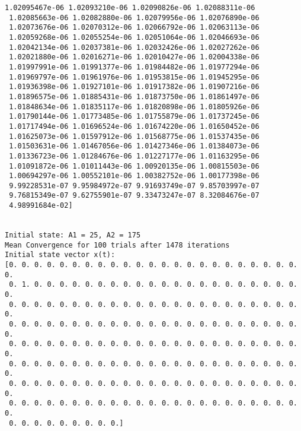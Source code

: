 \documentclass[11pt]{article}
\begin{document}
\begin{Verbatim}[commandchars=\\\{\}]
 1.02095467e-06 1.02093210e-06 1.02090826e-06 1.02088311e-06
 1.02085663e-06 1.02082880e-06 1.02079956e-06 1.02076890e-06
 1.02073676e-06 1.02070312e-06 1.02066792e-06 1.02063113e-06
 1.02059268e-06 1.02055254e-06 1.02051064e-06 1.02046693e-06
 1.02042134e-06 1.02037381e-06 1.02032426e-06 1.02027262e-06
 1.02021880e-06 1.02016271e-06 1.02010427e-06 1.02004338e-06
 1.01997991e-06 1.01991377e-06 1.01984482e-06 1.01977294e-06
 1.01969797e-06 1.01961976e-06 1.01953815e-06 1.01945295e-06
 1.01936398e-06 1.01927101e-06 1.01917382e-06 1.01907216e-06
 1.01896575e-06 1.01885431e-06 1.01873750e-06 1.01861497e-06
 1.01848634e-06 1.01835117e-06 1.01820898e-06 1.01805926e-06
 1.01790144e-06 1.01773485e-06 1.01755879e-06 1.01737245e-06
 1.01717494e-06 1.01696524e-06 1.01674220e-06 1.01650452e-06
 1.01625073e-06 1.01597912e-06 1.01568775e-06 1.01537435e-06
 1.01503631e-06 1.01467056e-06 1.01427346e-06 1.01384073e-06
 1.01336723e-06 1.01284676e-06 1.01227177e-06 1.01163295e-06
 1.01091872e-06 1.01011443e-06 1.00920135e-06 1.00815503e-06
 1.00694297e-06 1.00552101e-06 1.00382752e-06 1.00177398e-06
 9.99228531e-07 9.95984972e-07 9.91693749e-07 9.85703997e-07
 9.76815349e-07 9.62755901e-07 9.33473247e-07 8.32084676e-07
 4.98991684e-02]


Initial state: A1 = 25, A2 = 175
Mean Convergence for 100 trials after 1478 iterations
Initial state vector x(t):
[0. 0. 0. 0. 0. 0. 0. 0. 0. 0. 0. 0. 0. 0. 0. 0. 0. 0. 0. 0. 0. 0. 0. 0.
 0. 1. 0. 0. 0. 0. 0. 0. 0. 0. 0. 0. 0. 0. 0. 0. 0. 0. 0. 0. 0. 0. 0. 0.
 0. 0. 0. 0. 0. 0. 0. 0. 0. 0. 0. 0. 0. 0. 0. 0. 0. 0. 0. 0. 0. 0. 0. 0.
 0. 0. 0. 0. 0. 0. 0. 0. 0. 0. 0. 0. 0. 0. 0. 0. 0. 0. 0. 0. 0. 0. 0. 0.
 0. 0. 0. 0. 0. 0. 0. 0. 0. 0. 0. 0. 0. 0. 0. 0. 0. 0. 0. 0. 0. 0. 0. 0.
 0. 0. 0. 0. 0. 0. 0. 0. 0. 0. 0. 0. 0. 0. 0. 0. 0. 0. 0. 0. 0. 0. 0. 0.
 0. 0. 0. 0. 0. 0. 0. 0. 0. 0. 0. 0. 0. 0. 0. 0. 0. 0. 0. 0. 0. 0. 0. 0.
 0. 0. 0. 0. 0. 0. 0. 0. 0. 0. 0. 0. 0. 0. 0. 0. 0. 0. 0. 0. 0. 0. 0. 0.
 0. 0. 0. 0. 0. 0. 0. 0. 0.]



\end{Verbatim}
\end{document}
